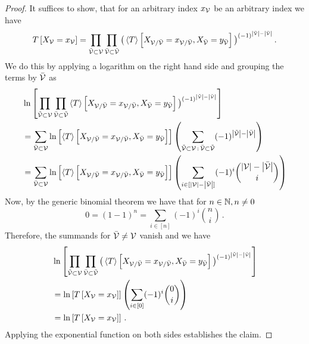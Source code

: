 \begin{proof}
    It suffices to show, that for an arbitrary index $x_{\mathcal{V}}$ be an arbitrary index we have
    \begin{align*}
        T\left[X_{\mathcal{V}}=x_{\mathcal{V}}\right]
        = \prod_{\tilde{\mathcal{V}}\subset\mathcal{V}} \prod_{\bar{\mathcal{V}}\subset\tilde{\mathcal{V}}}
        \big(\left\langle T\right\rangle \left[ X_{\mathcal{V}/\bar{\mathcal{V}}}=x_{\mathcal{V}/\bar{\mathcal{V}}}, X_{\bar{\mathcal{V}}} = y_{\bar{\mathcal{V}}} \right]\big)^{(-1)^{\left|\tilde{\mathcal{V}}\right|-\left|\bar{\mathcal{V}}\right|}} \, .
    \end{align*}
    We do this by applying a logarithm on the right hand side and grouping the terms by $\bar{\mathcal{V}}$ as
    \begin{align*}
        & \ln \left[ \prod_{\tilde{\mathcal{V}}\subset\mathcal{V}} \prod_{\bar{\mathcal{V}}\subset\tilde{\mathcal{V}}}
            \left\langle T\right\rangle \left[ X_{\mathcal{V}/\bar{\mathcal{V}}}=x_{\mathcal{V}/\bar{\mathcal{V}}}, X_{\bar{\mathcal{V}}} = y_{\bar{\mathcal{V}}} \right]\big)^{(-1)^{\left|\tilde{\mathcal{V}}\right|-\left|\bar{\mathcal{V}}\right|}} \right] \\
        & = \sum_{\bar{\mathcal{V}}\subset\mathcal{V}} \ln \left[ \left\langle T\right\rangle \left[ X_{\mathcal{V}/\bar{\mathcal{V}}}=x_{\mathcal{V}/\bar{\mathcal{V}}}, X_{\bar{\mathcal{V}}} = y_{\bar{\mathcal{V}}} \right] \right]
        \left( \sum_{\tilde{\mathcal{V}}\subset\mathcal{V} \, : \, \bar{\mathcal{V}}\subset \tilde{\mathcal{V}}} (-1)^{\left|\tilde{\mathcal{V}}\right|-\left|\bar{\mathcal{V}}\right|} \right) \\
        & =  \sum_{\bar{\mathcal{V}}\subset\mathcal{V}} \ln \left[ \left\langle T\right\rangle \left[ X_{\mathcal{V}/\bar{\mathcal{V}}}=x_{\mathcal{V}/\bar{\mathcal{V}}}, X_{\bar{\mathcal{V}}} = y_{\bar{\mathcal{V}}} \right] \right]
        \left( \sum_{i \in [\left|\mathcal{V}\right|-\left|\bar{\mathcal{V}}\right|]}  (-1)^{i}  \binom{\left|\mathcal{V}\right|-\left|\bar{\mathcal{V}}\right|}{i}  \right)
    \end{align*}
    Now, by the generic binomial theorem we have that for $n\in\mathbb{N}, n \neq 0$
    \[ 0 = (1-1)^n = \sum_{i \in [n]}  (-1)^{i}  \binom{n}{i}   \, . \]
    Therefore, the summands for $\bar{\mathcal{V}}\neq\mathcal{V}$ vanish and we have
    \begin{align*}
        & \ln \left[  \prod_{\tilde{\mathcal{V}}\subset\mathcal{V}} \prod_{\bar{\mathcal{V}}\subset\tilde{\mathcal{V}}}
            \big(\left\langle T\right\rangle \left[ X_{\mathcal{V}/\bar{\mathcal{V}}}=x_{\mathcal{V}/\bar{\mathcal{V}}}, X_{\bar{\mathcal{V}}} = y_{\bar{\mathcal{V}}} \right]\big)^{(-1)^{\left|\tilde{\mathcal{V}}\right|-\left|\bar{\mathcal{V}}\right|}}  \right] \\
        & = \ln \left[ T\left[X_{\mathcal{V}}=x_{\mathcal{V}}\right] \right]
        \left( \sum_{i \in [0]}  (-1)^{i}  \binom{0}{i}  \right) \\
        & = \ln \left[ T\left[X_{\mathcal{V}}=x_{\mathcal{V}}\right] \right] \, .
    \end{align*}
    Applying the exponential function on both sides establishes the claim.
\end{proof}

